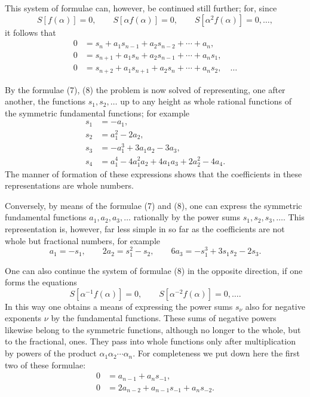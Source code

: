 \documentclass[11pt]{article}
\begin{document}
This system of formulae can, however, be continued still further; for, since
\[
 S[f(\alpha)]=0,\qquad S[\alpha f(\alpha)]=0,\qquad S[\alpha^2f(\alpha)]=0,\ldots,
\]
it follows that
\begin{equation}
\begin{aligned}
0&=s_n+a_1s_{n-1}+a_2s_{n-2}+\cdots+a_n,\\
0&=s_{n+1}+a_1s_n+a_2s_{n-1}+\cdots+a_ns_1,\\
0&=s_{n+2}+a_1s_{n+1}+a_2s_n+\cdots+a_ns_2,\quad\ldots
\end{aligned}
\tag{8}
\end{equation}

By the formulae (7), (8) the problem is now solved of representing, one after another, the functions $s_1,s_2,\ldots$ up to any height as whole rational functions of the symmetric fundamental functions; for example
\begin{equation}
\begin{aligned}
 s_1&=-a_1,\\
 s_2&=a_1^2-2a_2,\\
 s_3&=-a_1^3+3a_1a_2-3a_3,\\
 s_4&=a_1^4-4a_1^2a_2+4a_1a_3+2a_2^2-4a_4.
\end{aligned}
\tag{9}
\end{equation}
The manner of formation of these expressions shows that the coefficients in these representations are whole numbers.

Conversely, by means of the formulae (7) and (8), one can express the symmetric fundamental functions $a_1,a_2,a_3,\ldots$ rationally by the power sums $s_1,s_2,s_3,\ldots$. This representation is, however, far less simple in so far as the coefficients are not whole but fractional numbers, for example
\begin{equation}
 a_1=-s_1,\qquad
 2a_2=s_1^2-s_2,\qquad
 6a_3=-s_1^3+3s_1s_2-2s_3.
\tag{10}
\end{equation}

One can also continue the system of formulae (8) in the opposite direction, if one forms the equations
\[
 S[\alpha^{-1}f(\alpha)]=0,\qquad
 S[\alpha^{-2}f(\alpha)]=0,\ldots .
\]
In this way one obtains a means of expressing the power sums $s_\nu$ also for negative exponents $\nu$ by the fundamental functions. These sums of negative powers likewise belong to the symmetric functions, although no longer to the whole, but to the fractional, ones. They pass into whole functions only after multiplication by powers of the product $\alpha_1\alpha_2\cdots\alpha_n$. For completeness we put down here the first two of these formulae:
\begin{equation}
\begin{aligned}
0&=a_{n-1}+a_ns_{-1},\\
0&=2a_{n-2}+a_{n-1}s_{-1}+a_ns_{-2}.
\end{aligned}
\tag{11}
\end{equation}
\end{document}
